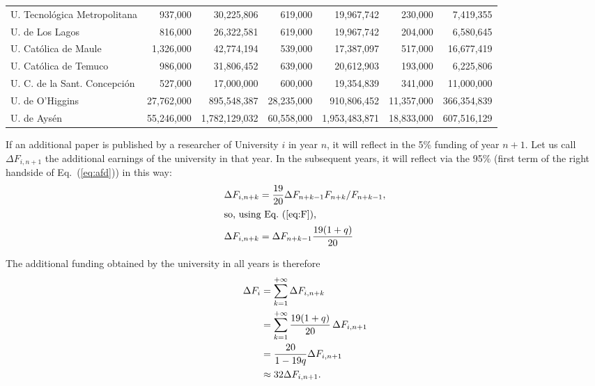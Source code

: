 \documentclass[twocolumn]{article}
\def\eqref#1{Eq.~(\ref{eq:#1})}
\begin{document}
\begin{table}[t]
\begin{tabular}{l rr rr rr}
U. Tecnológica Metropolitana   &       937,000 &      30,225,806 &       619,000 &      19,967,742 &       230,000 &       7,419,355 \\
U. de Los Lagos                &       816,000 &      26,322,581 &       619,000 &      19,967,742 &       204,000 &       6,580,645 \\
U. Católica de Maule           &     1,326,000 &      42,774,194 &       539,000 &      17,387,097 &       517,000 &      16,677,419 \\
U. Católica de Temuco          &       986,000 &      31,806,452 &       639,000 &      20,612,903 &       193,000 &       6,225,806 \\
U. C. de la Sant. Concepción   &       527,000 &      17,000,000 &       600,000 &      19,354,839 &       341,000 &      11,000,000 \\
U. de O'Higgins                &    27,762,000 &     895,548,387 &    28,235,000 &     910,806,452 &    11,357,000 &     366,354,839 \\
U. de Aysén                    &    55,246,000 &   1,782,129,032 &    60,558,000 &   1,953,483,871 &    18,833,000 &     607,516,129 \\
\hline
\end{tabular}
\end{table}

If an additional paper is published by a researcher of University $i$ in year $n$, it will reflect in the 5\% funding of year $n + 1$. Let us call $\Delta F_{i,n+1}$ the additional earnings 
of the university in that year.  In the subsequent years, it will reflect via the 95\% 
(first term of the right handside of \eqref{afd}) in this way:
\begin{align}
   \Delta F_{i,n+k} &=  \frac{19}{20} \Delta F_{n+k-1} F_{n+k}  / F_{n+k-1}, \notag\\
\intertext{so, using \eqref{F},}
   \Delta F_{i,n+k} &= \Delta F_{n+k-1}  \frac{ 19 (1 + q)} { 20}
\end{align}

The additional funding obtained by the university in all years is therefore
\begin{align}
    \Delta F_{i} &= \sum_{k=1}^{+\infty} \Delta F_{i,n+k} \notag \\
                 &= \sum_{k=1}^{+\infty} \frac{19(1 + q)}{20} \,\Delta F_{i,n+1} \notag \\
                 &= \frac{20} { 1 - 19q } \Delta F_{i,n+1}\\
                 &\approx 32 \Delta F_{i,n+1}. \notag
\end{align}
\end{document}
